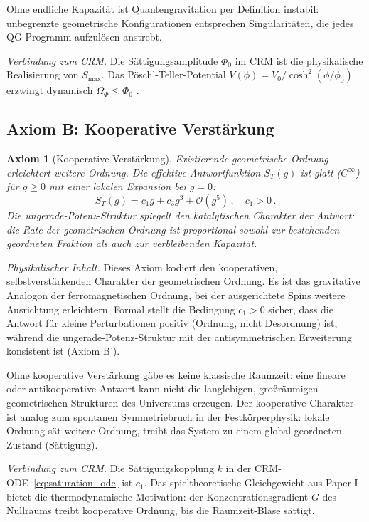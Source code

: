\documentclass[aps,prd,twocolumn,superscriptaddress,nofootinbib]{revtex4-2}
\newtheorem{axiom}{Axiom}
\begin{document}
Ohne endliche Kapazität ist Quantengravitation per Definition instabil: unbegrenzte geometrische Konfigurationen entsprechen Singularitäten, die jedes QG-Programm aufzulösen anstrebt.

\textit{Verbindung zum CRM.} Die Sättigungsamplitude $\Phi_0$ im CRM \cite{Geiger2026} ist die physikalische Realisierung von $S_{\max}$. Das Pöschl-Teller-Potential $V(\phi) = V_0/\cosh^2(\phi/\phi_0)$ erzwingt dynamisch $\Omega_\Phi \leq \Phi_0$ \cite{Geiger2026c}.

\subsection{Axiom B: Kooperative Verstärkung}

\begin{axiom}[Kooperative Verstärkung]
\label{ax:cooperative}
Existierende geometrische Ordnung erleichtert weitere Ordnung. Die effektive Antwortfunktion $S_T(g)$ ist glatt ($C^\infty$) für $g \geq 0$ mit einer lokalen Expansion bei $g = 0$:
\begin{equation}
S_T(g) = c_1 g + c_3 g^3 + \mathcal{O}(g^5)\,, \quad c_1 > 0\,.
\label{eq:ir_expansion}
\end{equation}
Die ungerade-Potenz-Struktur spiegelt den katalytischen Charakter der Antwort: die Rate der geometrischen Ordnung ist proportional sowohl zur bestehenden geordneten Fraktion als auch zur verbleibenden Kapazität.
\end{axiom}

\textit{Physikalischer Inhalt.} Dieses Axiom kodiert den kooperativen, selbstverstärkenden Charakter der geometrischen Ordnung. Es ist das gravitative Analogon der ferromagnetischen Ordnung, bei der ausgerichtete Spins weitere Ausrichtung erleichtern. Formal stellt die Bedingung $c_1 > 0$ sicher, dass die Antwort für kleine Perturbationen positiv (Ordnung, nicht Desordnung) ist, während die ungerade-Potenz-Struktur mit der antisymmetrischen Erweiterung konsistent ist (Axiom B').

Ohne kooperative Verstärkung gäbe es keine klassische Raumzeit: eine lineare oder antikooperative Antwort kann nicht die langlebigen, großräumigen geometrischen Strukturen des Universums erzeugen. Der kooperative Charakter ist analog zum spontanen Symmetriebruch in der Festkörperphysik: lokale Ordnung sät weitere Ordnung, treibt das System zu einem global geordneten Zustand (Sättigung).

\textit{Verbindung zum CRM.} Die Sättigungskopplung $k$ in der CRM-ODE~\eqref{eq:saturation_ode} ist $c_1$. Das spieltheoretische Gleichgewicht aus Paper I \cite{Geiger2026} bietet die thermodynamische Motivation: der Konzentrationsgradient $G$ des Nullraums treibt kooperative Ordnung, bis die Raumzeit-Blase sättigt.
\end{document}
